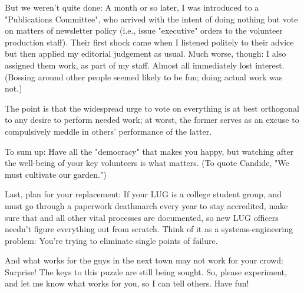 But we weren't quite done:  A month or so later, I was introduced to a 
"Publications Committee", who arrived with the intent of doing nothing but 
vote on matters of newsletter policy (i.e., issue "executive" orders to the 
volunteer production staff).  Their first shock came when I listened politely 
to their advice but then applied my editorial judgement as usual.  Much 
worse, though:  I also assigned them work, as part of my staff.  Almost 
all immediately lost interest. (Bossing around other people seemed likely 
to be fun; doing actual work was not.)

The point is that the widespread urge to vote on everything is at best
orthogonal to any desire to perform needed work; at worst, the former
serves as an excuse to compulsively meddle in others' performance
of the latter.

To sum up:  Have all the "democracy" that makes you happy, but watching after
the well-being of your key volunteers is what matters.  (To quote Candide, 
"We must cultivate our garden.")

Last, plan for your replacement:  If your LUG is a college student
group, and must go through a paperwork deathmarch every year to stay
accredited, make sure that and all other vital processes are documented,
so new LUG officers needn't figure everything out from scratch.  Think
of it as a systems-engineering problem:  You're trying to eliminate
single points of failure.

And what works for the guys in the next town may not work for your crowd:
Surprise!  The keys to this puzzle are still being sought.  So, please
experiment, and let me know what works for you, so I can tell others.
Have fun!

